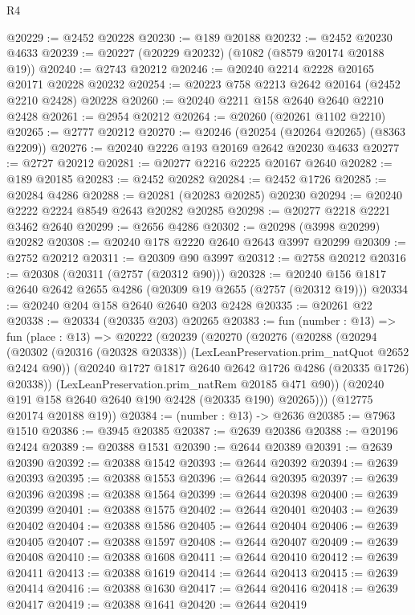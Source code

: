 \begin{lexlean}{R4}
\begin{coremodule}
@20229 := @2452 @20228
@20230 := @189 @20188
@20232 := @2452 @20230 @4633
@20239 := @20227 (@20229 @20232) (@1082 (@8579 @20174 @20188 @19))
@20240 := @2743 @20212
@20246 := @20240 @2214 @2228 @20165 @20171 @20228 @20232
@20254 := @20223 @758 @2213 @2642 @20164 (@2452 @2210 @2428) @20228
@20260 := @20240 @2211 @158 @2640 @2640 @2210 @2428
@20261 := @2954 @20212
@20264 := @20260 (@20261 @1102 @2210)
@20265 := @2777 @20212
@20270 := @20246 (@20254 (@20264 @20265) (@8363 @2209))
@20276 := @20240 @2226 @193 @20169 @2642 @20230 @4633
@20277 := @2727 @20212
@20281 := @20277 @2216 @2225 @20167 @2640
@20282 := @189 @20185
@20283 := @2452 @20282
@20284 := @2452 @1726
@20285 := @20284 @4286
@20288 := @20281 (@20283 @20285) @20230
@20294 := @20240 @2222 @2224 @8549 @2643 @20282 @20285
@20298 := @20277 @2218 @2221 @3462 @2640
@20299 := @2656 @4286
@20302 := @20298 (@3998 @20299) @20282
@20308 := @20240 @178 @2220 @2640 @2643 @3997 @20299
@20309 := @2752 @20212
@20311 := @20309 @90 @3997
@20312 := @2758 @20212
@20316 := @20308 (@20311 (@2757 (@20312 @90)))
@20328 := @20240 @156 @1817 @2640 @2642 @2655 @4286 (@20309 @19 @2655 (@2757 (@20312 @19)))
@20334 := @20240 @204 @158 @2640 @2640 @203 @2428
@20335 := @20261 @22
@20338 := @20334 (@20335 @203) @20265
@20383 := fun (number : @13) =>
  fun (place : @13) =>
  @20222
    (@20239
      (@20270
        (@20276
          (@20288
            (@20294
              (@20302 (@20316 (@20328 @20338)) (LexLeanPreservation.prim_natQuot @2652 @2424 @90))
              (@20240 @1727 @1817 @2640 @2642 @1726 @4286 (@20335 @1726) @20338))
            (LexLeanPreservation.prim_natRem @20185 @471 @90))
          (@20240 @191 @158 @2640 @2640 @190 @2428 (@20335 @190) @20265)))
      (@12775 @20174 @20188 @19))
@20384 := (number : @13) -> @2636
@20385 := @7963 @1510
@20386 := @3945 @20385
@20387 := @2639 @20386
@20388 := @20196 @2424
@20389 := @20388 @1531
@20390 := @2644 @20389
@20391 := @2639 @20390
@20392 := @20388 @1542
@20393 := @2644 @20392
@20394 := @2639 @20393
@20395 := @20388 @1553
@20396 := @2644 @20395
@20397 := @2639 @20396
@20398 := @20388 @1564
@20399 := @2644 @20398
@20400 := @2639 @20399
@20401 := @20388 @1575
@20402 := @2644 @20401
@20403 := @2639 @20402
@20404 := @20388 @1586
@20405 := @2644 @20404
@20406 := @2639 @20405
@20407 := @20388 @1597
@20408 := @2644 @20407
@20409 := @2639 @20408
@20410 := @20388 @1608
@20411 := @2644 @20410
@20412 := @2639 @20411
@20413 := @20388 @1619
@20414 := @2644 @20413
@20415 := @2639 @20414
@20416 := @20388 @1630
@20417 := @2644 @20416
@20418 := @2639 @20417
@20419 := @20388 @1641
@20420 := @2644 @20419

\end{coremodule}
\end{lexlean}
